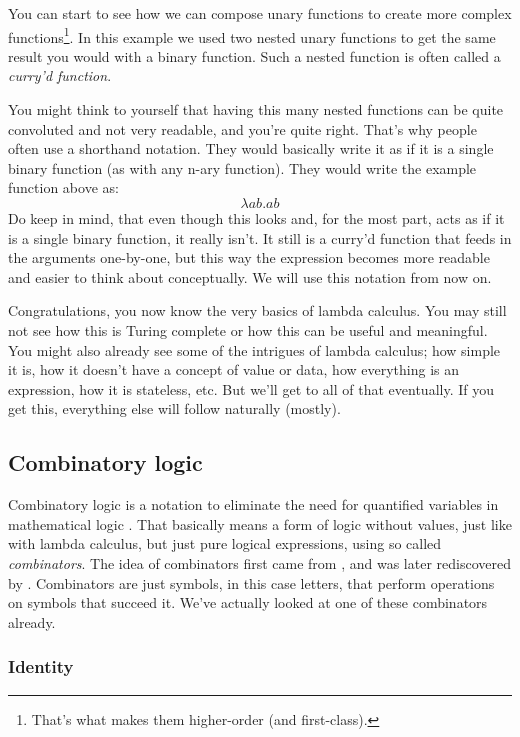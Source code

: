 \documentclass[11pt]{article}
\begin{document}
You can start to see how we can compose unary functions to create more complex
functions\footnote{That's what makes them higher-order (and first-class).}. In
this example we used two nested unary functions to get the same result you
would with a binary function. Such a nested function is often called a
\emph{curry'd function}.

You might think to yourself that having this many nested functions can be quite
convoluted and not very readable, and you're quite right. That's why people
often use a shorthand notation. They would basically write it as if it is a
single binary function (as with any n-ary function). They would write the
example function above as:
\[\lambda ab.ab\]
Do keep in mind, that even though this looks and, for the most part, acts as if
it is a single binary function, it really isn't. It still is a curry'd function
that feeds in the arguments one-by-one, but this way the expression becomes
more readable and easier to think about conceptually. We will use this notation
from now on.

Congratulations, you now know the very basics of lambda calculus. You may still
not see how this is Turing complete or how this can be useful and meaningful.
You might also already see some of the intrigues of lambda calculus; how simple
it is, how it doesn't have a concept of value or data, how everything is an
expression, how it is stateless, etc. But we'll get to all of that eventually.
If you get this, everything else will follow naturally (mostly).

\subsection{Combinatory logic}

Combinatory logic is a notation to eliminate the need for quantified variables
in mathematical logic \parencite{wiki:Combinatory_logic}. That basically means
a form of logic without values, just like with lambda calculus, but just pure
logical expressions, using so called \emph{combinators}. The idea of
combinators first came from \textcite{schonfinkel1924}, and was later
rediscovered by \textcite{curry1930}. Combinators are just symbols, in this
case letters, that perform operations on symbols that succeed it. We've
actually looked at one of these combinators already.

\subsubsection{Identity}
\end{document}
